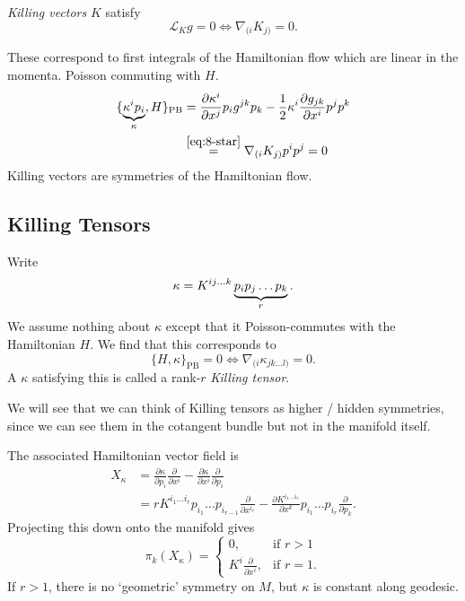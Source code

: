 \begin{definition}
  \emph{Killing vectors} $K$ satisfy
  \begin{equation}
    \mathcal{L}_K g = 0 \iff \nabla_{(i} K_{j)} = 0.
  \end{equation}
\end{definition}
These correspond to first integrals of the Hamiltonian flow which are linear in the momenta.
Poisson commuting with $H$.
\begin{align}
  \{ \underbrace{\kappa^{i} p_i}_{\mathclap{\kappa}}, H \}_{\text{PB}} &= \frac{\partial \kappa^{i}}{\partial x^{j}} p_{i} g^{jk} p_k - \frac{1}{2} \kappa^{i} \frac{\partial g_{jk}}{\partial x^{i}} p^{j} p^{k} \\
								       &\stackrel{\eqref{eq:8-star}}{=} \nabla_{(i} K_{j)} p^{i} p^{j} = 0
\end{align}
Killing vectors are symmetries of the Hamiltonian flow.

\subsection{Killing Tensors}%
\label{sub:killing_tensors}

\begin{definition}
  Write
  \begin{equation}
    \kappa = K^{ij \dots k} \underbrace{p_i p_j \dots p_k}_{\mathclap{r}}.
  \end{equation}
  We assume nothing about $\kappa$ except that it Poisson-commutes with the Hamiltonian $H$.
  We find that this corresponds to
  \begin{equation}
    \{ H, \kappa \}_{\text{PB}} = 0 \iff \nabla_{(i} \kappa_{jk \dots l)} = 0.
  \end{equation}
  A $\kappa$ satisfying this is called a rank-$r$ \emph{Killing tensor}.
\end{definition}
We will see that we can think of Killing tensors as higher / hidden symmetries, since we can see them in the cotangent bundle but not in the manifold itself.

The associated Hamiltonian vector field is
\begin{align}
  X_\kappa &= \frac{\partial \kappa}{\partial p_{i}} \frac{\partial }{\partial x^{i}} - \frac{\partial \kappa}{\partial x^{i}} \frac{\partial }{\partial p_i} \\
  &= r K^{i_1 \dots i_r} p_{i_1} \dots p_{i_{r-1}} \frac{\partial }{\partial x^{i_r}} - \frac{\partial K^{i_1 \dots i_r}}{\partial x^k} p_{i_1} \dots p_{i_r} \frac{\partial }{\partial p_k}.
\end{align}
Projecting this down onto the manifold gives
\begin{equation}
  \pi_k (X_\kappa) = 
  \begin{cases}
    0, & \text{if } r > 1 \\
    K^i \frac{\partial }{\partial x^{i}}, & \text{if } r = 1. 
  \end{cases}
\end{equation}
If $r >1$, there is no `geometric' symmetry on $M$, but $\kappa$ is constant along geodesic.

